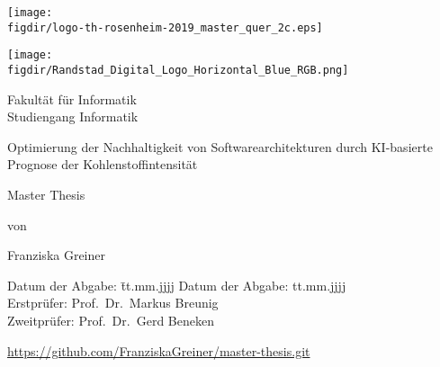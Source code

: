 \begin{titlepage}

\sffamily

\begin{flushright}

\vspace*{-2cm}

\texttt{[image: \\figdir/logo-th-rosenheim-2019\_master\_quer\_2c.eps]}

\end{flushright}
\begin{flushleft}

\vspace*{-2cm}

\texttt{[image: \\figdir/Randstad\_Digital\_Logo\_Horizontal\_Blue\_RGB.png]}
\end{flushleft}

\vfill

\centering
\LARGE
Fakultät für Informatik  \vspace{0.5cm}\\
\Large
Studiengang Informatik

\vspace{2cm}

\LARGE

Optimierung der Nachhaltigkeit von Softwarearchitekturen durch KI-basierte Prognose der Kohlenstoffintensität

\vspace{2cm}

\Large
Master Thesis

\vspace{1.5cm}


\Large
von

\vspace{0.5cm}


\LARGE
Franziska Greiner \vspace{1cm}

\vspace{1cm}

\flushleft
 \Large
\vspace*{\fill}

\begin{tabbing}
Datum der Abgabe: \= tt.mm.jjjj \kill
Datum der Abgabe: \> tt.mm.jjjj \\
Erstprüfer: \> Prof.\ Dr.\ Markus Breunig\\
Zweitprüfer: \> Prof.\ Dr.\ Gerd Beneken
\end{tabbing}

\vspace{1cm}
\centering
\small
\url{https://github.com/FranziskaGreiner/master-thesis.git}

\end{titlepage}


